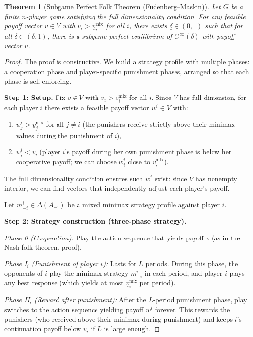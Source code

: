\documentclass[11pt,a4paper]{article}
\theoremstyle{definition}
\theoremstyle{plain}
\newtheorem{theorem}{Theorem}[section]
\theoremstyle{remark}
\begin{document}
\begin{theorem}[Subgame Perfect Folk Theorem (Fudenberg--Maskin)]
\label{thm:spe-folk}
Let $G$ be a finite $n$-player game satisfying the full dimensionality condition. For any
feasible payoff vector $v \in V$ with $v_i > \underline{v}_i^{\text{mix}}$ for all $i$,
there exists $\underline{\delta} \in (0,1)$ such that for all
$\delta \in (\underline{\delta}, 1)$, there is a subgame perfect equilibrium of
$G^\infty(\delta)$ with payoff vector $v$.
\end{theorem}

\begin{proof}
The proof is constructive. We build a strategy profile with multiple phases: a cooperation
phase and player-specific punishment phases, arranged so that each phase is self-enforcing.

\textbf{Step 1: Setup.}
Fix $v \in V$ with $v_i > \underline{v}_i^{\text{mix}}$ for all $i$. Since $V$ has full
dimension, for each player $i$ there exists a feasible payoff vector $w^i \in V$ with:
\begin{enumerate}[label=(\roman*)]
    \item $w^i_j > \underline{v}_j^{\text{mix}}$ for all $j \neq i$ (the punishers receive
    strictly above their minimax values during the punishment of $i$),
    \item $w^i_i < v_i$ (player $i$'s payoff during her own punishment phase is below her
    cooperative payoff; we can choose $w^i_i$ close to $\underline{v}_i^{\text{mix}}$).
\end{enumerate}
The full dimensionality condition ensures such $w^i$ exist: since $V$ has nonempty interior,
we can find vectors that independently adjust each player's payoff.

Let $m^i_{-i} \in \Delta(A_{-i})$ be a mixed minimax strategy profile against player $i$.

\textbf{Step 2: Strategy construction (three-phase strategy).}

\emph{Phase 0 (Cooperation):} Play the action sequence that yields payoff $v$ (as in the
Nash folk theorem proof).

\emph{Phase I$_i$ (Punishment of player $i$):} Lasts for $L$ periods. During this phase,
the opponents of $i$ play the minimax strategy $m^i_{-i}$ in each period, and player $i$
plays any best response (which yields at most $\underline{v}_i^{\text{mix}}$ per period).

\emph{Phase II$_i$ (Reward after punishment):} After the $L$-period punishment phase, play
switches to the action sequence yielding payoff $w^i$ forever. This rewards the punishers
(who received above their minimax during punishment) and keeps $i$'s continuation payoff
below $v_i$ if $L$ is large enough.


\end{proof}
\end{document}
